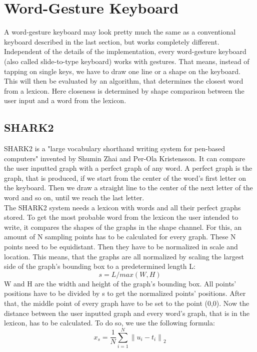 \section{Word-Gesture Keyboard}
A word-gesture keyboard may look pretty much the same as a conventional keyboard described in the last section, but works completely different. Independent of the details of the implementation, every word-gesture keyboard (also called slide-to-type keyboard) works with gestures. That means, instead of tapping on single keys, we have to draw one line or a shape on the keyboard. This will then be evaluated by an algorithm, that determines the closest word from a lexicon. Here closeness is determined by shape comparison between the user input and a word from the lexicon. 

\subsection{SHARK2}
SHARK2 is a "large vocabulary shorthand writing system for pen-based computers" \cite{Kristensson2004SHARK2AL} invented by Shumin Zhai and Per-Ola Kristensson. It can compare the user inputted graph with a perfect graph of any word. A perfect graph is the graph, that is produced, if we start from the center of the word's first letter on the keyboard. Then we draw a straight line to the center of the next letter of the word and so on, until we reach the last letter.\\
The SHARK2 system needs a lexicon with words and all their perfect graphs stored. To get the most probable word from the lexicon the user intended to write, it compares the shapes of the graphs in the shape channel. For this, an amount of N sampling points has to be calculated for every graph. These N points need to be equidistant. Then they have to be normalized in scale and location. This means, that the graphs are all normalized by scaling the largest side of the graph's bounding box to a predetermined length L: 
\begin{equation}
    s = L / max(W,H)
\end{equation}
W and H are the width and height of the graph's bounding box. All points' positions have to be divided by s to get the normalized points' positions. After that, the middle point of every graph have to be set to the point (0,0). Now the distance between the user inputted graph and every word's graph, that is in the lexicon, has to be calculated. To do so, we use the following formula:
\begin{equation}
    x_s = \frac{1}{N}\sum_{i = 1}^{N}\left\lVert u_i - t_i\right\rVert_2
\end{equation}
